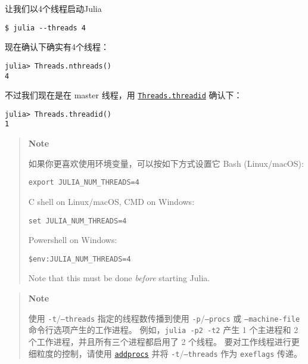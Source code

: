 让我们以4个线程启动Julia




\begin{lstlisting}
$ julia --threads 4
\end{lstlisting}



现在确认下确实有4个线程：




\begin{verbatim}
julia> Threads.nthreads()
4
\end{verbatim}



不过我们现在是在 master 线程，用 \hyperlink{12668125807854133993}{\texttt{Threads.threadid}} 确认下：




\begin{verbatim}
julia> Threads.threadid()
1
\end{verbatim}



\begin{quote}
\textbf{Note}

如果你更喜欢使用环境变量，可以按如下方式设置它 Bash (Linux/macOS):


\begin{lstlisting}
export JULIA_NUM_THREADS=4
\end{lstlisting}

C shell on Linux/macOS, CMD on Windows:


\begin{lstlisting}
set JULIA_NUM_THREADS=4
\end{lstlisting}

Powershell on Windows:


\begin{lstlisting}
$env:JULIA_NUM_THREADS=4
\end{lstlisting}

Note that this must be done \emph{before} starting Julia.

\end{quote}


\begin{quote}
\textbf{Note}

使用 \texttt{-t}/\texttt{--threads} 指定的线程数传播到使用 \texttt{-p}/\texttt{--procs} 或 \texttt{--machine-file} 命令行选项产生的工作进程。 例如，\texttt{julia -p2 -t2} 产生 1 个主进程和 2 个工作进程，并且所有三个进程都启用了 2 个线程。 要对工作线程进行更细粒度的控制，请使用 \hyperlink{2657399037748470653}{\texttt{addprocs}} 并将 \texttt{-t}/\texttt{--threads} 作为 \texttt{exeflags} 传递。

\end{quote}


